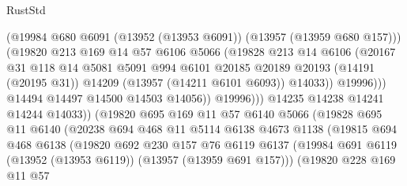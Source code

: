 \begin{lexlean}{RustStd}
\begin{coremodule}
                              (@19984
                                @680
                                @6091
                                (@13952 (@13953 @6091))
                                (@13957 (@13959 @680 @157)))
                              (@19820
                                @213
                                @169
                                @14
                                @57
                                @6106
                                @5066
                                (@19828
                                  @213
                                  @14
                                  @6106
                                  (@20167
                                    @31
                                    @118
                                    @14
                                    @5081
                                    @5091
                                    @994
                                    @6101
                                    @20185
                                    @20189
                                    @20193
                                    (@14191 (@20195 @31))
                                    @14209
                                    (@13957 (@14211 @6101 @6093))
                                    @14033))
                                @19996)))
                          @14494
                          @14497
                          @14500
                          @14503
                          @14056))
                      @19996)))
                @14235
                @14238
                @14241
                @14244
                @14033))
            (@19820
              @695
              @169
              @11
              @57
              @6140
              @5066
              (@19828
                @695
                @11
                @6140
                (@20238
                  @694
                  @468
                  @11
                  @5114
                  @6138
                  @4673
                  @1138
                  (@19815
                    @694
                    @468
                    @6138
                    (@19820
                      @692
                      @230
                      @157
                      @76
                      @6119
                      @6137
                      (@19984 @691 @6119 (@13952 (@13953 @6119)) (@13957 (@13959 @691 @157)))
                      (@19820
                        @228
                        @169
                        @11
                        @57

\end{coremodule}
\end{lexlean}
